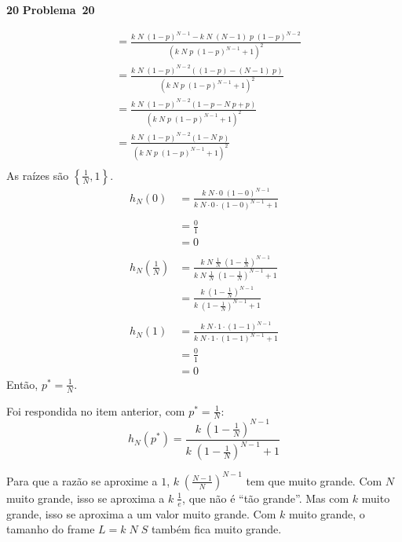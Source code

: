 \documentclass{article}
\newcounter{exe-list}
\newenvironment{exe-list}
    {\begin{list}{\alph{exe-list}.}{\usecounter{exe-list}}}
    {\end{list}}
\newenvironment{exe}[2][Problema]
    {\newcommand{\opt}{(Opcional)}%
    \newcommand{\sketch}[1]{{\bfseries Rascunho:} ##1}%
    \medskip\par\noindent\ifthenelse{\equal{#1}{}}
        {\textbf{\large #2}}
        {\textbf{\large #1~#2}}%
    \medskip\par\noindent}
    {\medskip}
\begin{document}
\begin{exe}{20}
\begin{exe-list}
\begin{align*}
            &= \frac{k \; N \; (1-p)^{N-1} - k \; N \; (N-1) \; p \; (1-p)^{N-2}}{(k \; N \; p \; (1-p)^{N-1} + 1)^2} \\
            &= \frac{k \; N \; (1-p)^{N-2} ((1-p) - (N-1) \; p)}{(k \; N \; p \; (1-p)^{N-1} + 1)^2} \\
            &= \frac{k \; N \; (1-p)^{N-2} (1 - p - N \; p + p)}{(k \; N \; p \; (1-p)^{N-1} + 1)^2} \\
            &= \frac{k \; N \; (1-p)^{N-2} (1 - N \; p)}{(k \; N \; p \; (1-p)^{N-1} + 1)^2} \\
        \end{align*}
        As raízes são \(\left\{ \frac1N, 1 \right\}\).
        \begin{align*}
            h_N(0)
                &= \frac{k \; N \cdot 0 \; (1-0)^{N-1}}{k \; N \cdot 0 \cdot (1-0)^{N-1} + 1} \\\\
                &= \frac{0}{1} \\
                &= 0 \\\\
            h_N\left(\frac1N\right)
                &= \frac{k \; N \; \frac1N \; (1-\frac1N)^{N-1}}{k \; N \; \frac1N \; (1-\frac1N)^{N-1} + 1} \\
                &= \frac{k \; (1-\frac1N)^{N-1}}{k \; (1-\frac1N)^{N-1} + 1} \\\\
            h_N(1)
                &= \frac{k \; N \cdot 1 \cdot (1-1)^{N-1}}{k \; N \cdot 1 \cdot (1-1)^{N-1} + 1} \\
                &= \frac{0}{1} \\
                &= 0
        \end{align*}
        Então, \(p^* = \frac1N\).
    \item
        Foi respondida no item anterior,
        com \(p^* = \frac1N\):
        \[
            h_N(p^*) =
            \frac{k \; (1-\frac1N)^{N-1}}{k \; (1-\frac1N)^{N-1} + 1}
        \]
    \item
        Para que a razão se aproxime a \(1\),
        \(k \; (\frac{N-1}{N})^{N-1}\) tem que muito grande.
        Com \(N\) muito grande, isso se aproxima a
        \(k \; \frac1e\),
        que não é ``tão grande''.
        Mas com \(k\) muito grande, isso se aproxima
        a um valor muito grande.
        Com \(k\) muito grande,
        o tamanho do frame \(L = k \; N \; S\)
        também fica muito grande.
    \end{exe-list}
\end{exe}
\end{document}
